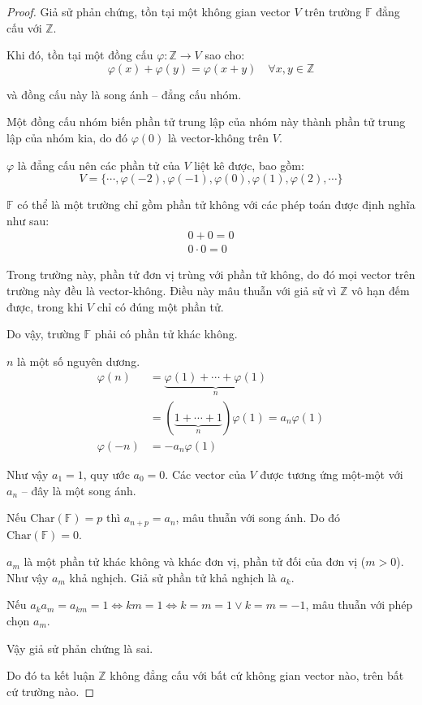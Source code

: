 \documentclass[class=linearalgebra,crop=false]{standalone}
\begin{document}
\begin{proof}Giả sử phản chứng, tồn tại một không gian vector $V$ trên trường $\mathbb{F}$ đẳng cấu với $\mathbb{Z}$.
    \par Khi đó, tồn tại một đồng cấu $\varphi: \mathbb{Z}\rightarrow V$ sao cho:
    \[ \varphi(x) + \varphi(y) = \varphi(x + y)\quad\forall x, y\in\mathbb{Z} \]
    \par và đồng cấu này là song ánh -- đẳng cấu nhóm.
    \par Một đồng cấu nhóm biến phần tử trung lập của nhóm này thành phần tử trung lập của nhóm kia, do đó $\varphi(0)$ là vector-không trên $V$.
    \par $\varphi$ là đẳng cấu nên các phần tử của $V$ liệt kê được, bao gồm:
    \[ V = \{ \cdots, \varphi(-2), \varphi(-1), \varphi(0), \varphi(1), \varphi(2), \cdots \} \]
    \par $\mathbb{F}$ có thể là một trường chỉ gồm phần tử không với các phép toán được định nghĩa như sau:
    \begin{align*}
        0 + 0 = 0 \\
        0\cdot 0 = 0
    \end{align*}
    \par Trong trường này, phần tử đơn vị trùng với phần tử không, do đó mọi vector trên trường này đều là vector-không. Điều này mâu thuẫn với giả sử vì $\mathbb{Z}$ vô hạn đếm được, trong khi $V$ chỉ có đúng một phần tử.
    \par Do vậy, trường $\mathbb{F}$ phải có phần tử khác không.
    \par $n$ là một số nguyên dương.
    \begin{align*}
        \varphi(n)&=\underbrace{\varphi(1) + \cdots + \varphi(1)}_{n} \\
                  &=(\underbrace{1 + \cdots + 1}_{n})\varphi(1) =a_{n}\varphi(1) \\
        \varphi(-n)&=-a_{n}\varphi(1)
    \end{align*}
    \par Như vậy $a_{1} = 1$, quy ước $a_{0} = 0$. Các vector của $V$ được tương ứng một-một với $a_{n}$ -- đây là một song ánh.
    \par Nếu $\text{Char}(\mathbb{F}) = p$ thì $a_{n + p} = a_{n}$, mâu thuẫn với song ánh. Do đó $\text{Char}(\mathbb{F}) = 0$.
    \par $a_{m}$ là một phần tử khác không và khác đơn vị, phần tử đối của đơn vị ($m > 0$). Như vậy $a_{m}$ khả nghịch. Giả sử phần tử khả nghịch là $a_{k}$.
    \par Nếu $a_{k}a_{m} = a_{km} = 1 \Leftrightarrow km = 1 \Leftrightarrow k = m = 1 \vee k = m = -1$, mâu thuẫn với phép chọn $a_{m}$.
    \par Vậy giả sử phản chứng là sai.
    \par Do đó ta kết luận $\mathbb{Z}$ không đẳng cấu với bất cứ không gian vector nào, trên bất cứ trường nào.
\end{proof}
\end{document}

